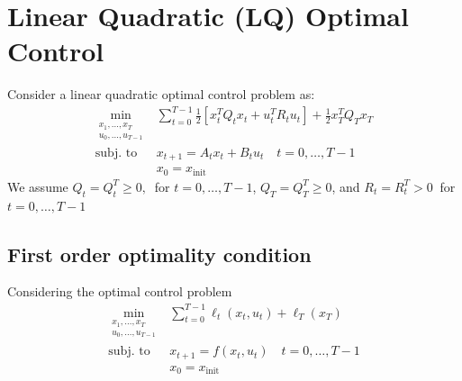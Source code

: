 \documentclass[openany]{book}
\theoremstyle{definition}
\theoremstyle{remark}
\begin{document}
\chapter{Linear Quadratic (LQ) Optimal Control}

Consider a linear quadratic optimal control problem as: 
\begin{align*}
        \min_{\substack{x_1,\dots,x_T \\ u_0,\dots,u_{T-1}}} & \displaystyle\sum_{t=0}^{T-1}\displaystyle\frac{1}{2}[x_t^TQ_tx_t+u_t^TR_tu_t] + \displaystyle\frac{1}{2}x_T^TQ_Tx_T\\
        \text{subj. to } & x_{t+1} = A_tx_t + B_tu_t \quad t=0,\dots,T-1\\
                        &x_0 = x_{\text{init}}
\end{align*}
We assume $Q_t=Q_t^T\geq 0,\ $ for $ t=0,\dots,T-1$, $Q_T = Q_T^T \geq 0$, and $R_t=R_t^T > 0 \ $ for $t=0,\dots,T-1$

\section{First order optimality condition}

Considering the optimal control problem
\begin{align*}
        \min_{\substack{x_1,\dots,x_T \\ u_0,\dots,u_{T-1}}} & \displaystyle\sum_{t=0}^{T-1}\displaystyle \ell_t(x_t,u_t) + \ell_T(x_T)\\
        \text{subj. to } & x_{t+1} = f(x_t,u_t) \quad t=0,\dots,T-1\\
                        &x_0 = x_{\text{init}}
\end{align*}
\end{document}
